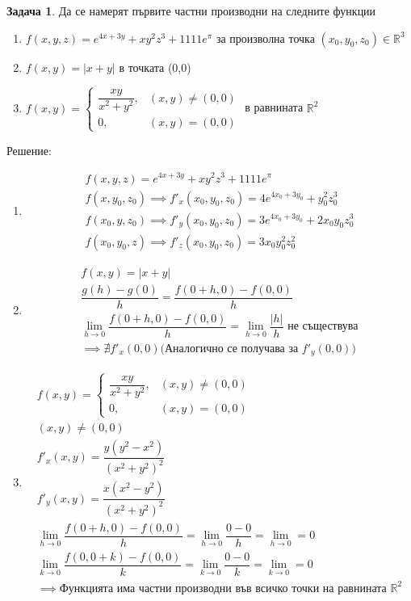 \documentclass[a4paper,fleqn,12pt]{article}
\theoremstyle{definition}
\newtheorem{task}{Задача}[subsection]
\begin{document}
\begin{task}
Да се намерят първите частни производни на следните функции
\begin{enumerate}

\item $f(x,y,z) = e^{4x+3y} + xy^2z^3 + 1111e^\pi$ за произволна точка $(x_0, y_0, z_0) \in \mathbb{R}^3$
\item $f(x,y) = \vert x + y \vert$ в точката (0,0)
\item $
f(x,y) = 
\begin{cases}
\dfrac{xy}{x^2 + y^2}, & (x,y) \neq (0,0)  \\
0, & (x,y) = (0,0) 
\end{cases}$ в равнината $\mathbb{R}^2$ 
\end{enumerate}
Решение: \\

\begin{enumerate}
\item 
\begin{gather*}
f(x,y,z) = e^{4x+3y} + xy^2z^3 + 1111e^\pi \\
f(x,y_0,z_0) \implies f'_x (x_0,y_0,z_0) = 4e^{4x_0+3y_0} + y_0 ^2 z_0 ^3 \\
f(x_0,y,z_0) \implies f'_y (x_0,y_0,z_0) = 3e^{4x_0+3y_0} + 2x_0 y_0 z_0 ^3 \\
f(x_0,y_0,z) \implies f'_z (x_0,y_0,z_0) = 3x_0 y_0 ^2 z_0 ^2
\end{gather*}

\item 
\begin{gather*}
f(x,y) = \vert x + y \vert \\
\dfrac{g(h) - g(0)}{h} = \dfrac{f(0+h,0) - f(0,0)}{h} \\
\lim\limits_{h \to 0} \dfrac{f(0+h,0) - f(0,0)}{h} = \lim\limits_{h \to 0} \dfrac{\vert h \vert}{h} \text{ не съществува} \\
\implies \nexists f'_x (0,0) \text{(Аналогично се получава за $f'_y(0,0)$)} 
\end{gather*}

\item 
\begin{gather*}
f(x,y) = 
\begin{cases}
\dfrac{xy}{x^2 + y^2}, & (x,y) \neq (0,0)  \\
0, & (x,y) = (0,0) 
\end{cases}\\
(x,y) \neq (0,0)\\
f'_x (x,y) = \dfrac{y(y^2 - x^2)}{(x^2 + y^2)^2}\\
f'_y (x,y) = \dfrac{x(x^2 - y^2)}{(x^2 + y^2)^2}\\
\lim\limits_{h \to 0} \dfrac{f(0+h,0) - f(0,0)}{h} = \lim\limits_{h \to 0} \dfrac{0-0}{h} = \lim\limits_{h \to 0} = 0 \\
\lim\limits_{k \to 0} \dfrac{f(0,0+k) - f(0,0)}{k} =  \lim\limits_{k \to 0} \dfrac{0-0}{k} = \lim\limits_{k \to 0} = 0 \\
\implies  \text{Функцията има частни производни във всичко точки на равнината $\mathbb{R}^2$}
\end{gather*}


\end{enumerate}
\end{task}
\end{document}
